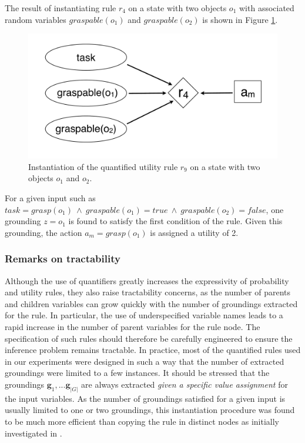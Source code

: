 The result of instantiating rule $r_4$ on a state with two objects $o_1$ with associated random variables $\mathit{graspable}(o_1)$ and $\mathit{graspable}(o_2)$ is shown in Figure \ref{fig:quantinstantitionutil}. 

\begin{figure}[h]
\centering
\includegraphics[scale=0.25]{imgs/quantutilruleinstantiation.pdf}
\caption{Instantiation of the quantified utility rule $r_9$ on a state with two objects $o_1$ and $o_2$.}
\label{fig:quantinstantitionutil}
\end{figure}

For a given input such as $\mathit{task}=\mathit{grasp}(o_1) \ \land \ \mathit{graspable}(o_1) = \mathit{true} \ \land \ \mathit{graspable}(o_2) = \mathit{false}$, one grounding $z=o_1$ is found to satisfy the first condition of the rule.  Given this grounding, the action  $a_m=\mathit{grasp}(o_1)$ is assigned a utility of 2. 

\subsubsection*{Remarks on tractability}

Although the use of quantifiers greatly increases the expressivity of probability and utility rules, they also raise tractability concerns, as the number of parents and children variables can grow quickly with the number of groundings extracted for the rule. In particular, the use of underspecified variable names leads to a rapid increase in the number of parent variables for the rule node. The specification of such rules should therefore be carefully engineered to ensure the inference problem remains tractable.  In practice, most of the quantified rules used in our experiments were designed in such a way that the number of extracted groundings were limited to a few instances.   It should be stressed that the groundings $\mathbf{g}_1,...\mathbf{g}_{|G|}$ are always extracted \textit{given a specific value assignment} for the input variables.  As the number of groundings satisfied for a given input is usually limited to one or two groundings, this instantiation procedure was found to be much more efficient than copying the rule in distinct nodes as initially investigated in \cite{relational-apl2012}.  

